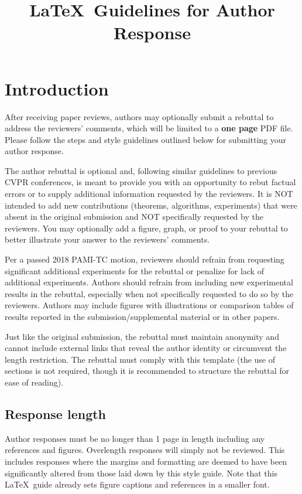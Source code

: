 \documentclass[10pt,twocolumn,letterpaper]{article}
\begin{document}
\title{\LaTeX\ Guidelines for Author Response}  %

\maketitle
\thispagestyle{empty}
\appendix

\section{Introduction}

After receiving paper reviews, authors may optionally submit a rebuttal to address the reviewers' comments, which will be limited to a {\bf one page} PDF file.
Please follow the steps and style guidelines outlined below for submitting your author response.

The author rebuttal is optional and, following similar guidelines to previous CVPR conferences, is meant to provide you with an opportunity to rebut factual errors or to supply additional information requested by the reviewers.
It is NOT intended to add new contributions (theorems, algorithms, experiments) that were absent in the original submission and NOT specifically requested by the reviewers.
You may optionally add a figure, graph, or proof to your rebuttal to better illustrate your answer to the reviewers' comments.

Per a passed 2018 PAMI-TC motion, reviewers should refrain from requesting significant additional experiments for the rebuttal or penalize for lack of additional experiments.
Authors should refrain from including new experimental results in the rebuttal, especially when not specifically requested to do so by the reviewers.
Authors may include figures with illustrations or comparison tables of results reported in the submission/supplemental material or in other papers.

Just like the original submission, the rebuttal must maintain anonymity and cannot include external links that reveal the author identity or circumvent the length restriction.
The rebuttal must comply with this template (the use of sections is not required, though it is recommended to structure the rebuttal for ease of reading).


\subsection{Response length}
Author responses must be no longer than 1 page in length including any references and figures.
Overlength responses will simply not be reviewed.
This includes responses where the margins and formatting are deemed to have been significantly altered from those laid down by this style guide.
Note that this \LaTeX\ guide already sets figure captions and references in a smaller font.
\end{document}
